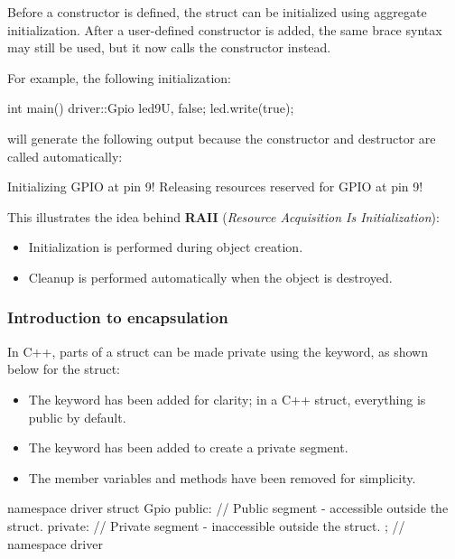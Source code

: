\noindent Before a constructor is defined, the struct can be initialized using aggregate
initialization. After a user-defined constructor is added, the same brace syntax may still be used,
but it now calls the constructor instead.

For example, the following initialization:

\begin{cppcode}
int main()
{
    driver::Gpio led{9U, false};
    led.write(true);
}
\end{cppcode}

\noindent will generate the following output because the constructor and destructor are called
automatically:

\begin{console}
Initializing GPIO at pin 9!
Releasing resources reserved for GPIO at pin 9!
\end{console}

\noindent This illustrates the idea behind \textbf{RAII} (\emph{Resource Acquisition Is
Initialization}):
\begin{itemize}
  \item Initialization is performed during object creation.
  \item Cleanup is performed automatically when the object is destroyed.
\end{itemize}

\subsubsection{Introduction to encapsulation}
In C++, parts of a struct can be made private using the  keyword, as shown below for
the  struct:
\begin{itemize}
  \item The  keyword has been added for clarity; in a C++ struct, everything is public
    by default.
  \item The  keyword has been added to create a private segment.
  \item The member variables and methods have been removed for simplicity.
\end{itemize}

\begin{cppcode}
namespace driver
{
struct Gpio
{
public:
    // Public segment - accessible outside the struct.
private:
    // Private segment - inaccessible outside the struct.
};
} // namespace driver
\end{cppcode}

